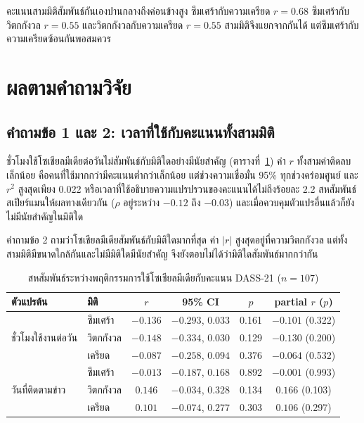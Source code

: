คะแนนสามมิติสัมพันธ์กันเองปานกลางถึงค่อนข้างสูง
ซึมเศร้ากับความเครียด $r = 0.68$ ซึมเศร้ากับวิตกกังวล $r = 0.55$ และวิตกกังวลกับความเครียด $r = 0.55$
สามมิติจึงแยกจากกันได้ แต่ซึมเศร้ากับความเครียดซ้อนกันพอสมควร

\section{ผลตามคำถามวิจัย}

\subsection{คำถามข้อ 1 และ 2: เวลาที่ใช้กับคะแนนทั้งสามมิติ}

ชั่วโมงใช้โซเชียลมีเดียต่อวันไม่สัมพันธ์กับมิติใดอย่างมีนัยสำคัญ (ตารางที่~\ref{tab:q123})
ค่า $r$ ทั้งสามค่าติดลบเล็กน้อย คือคนที่ใช้มากกว่ามีคะแนนต่ำกว่าเล็กน้อย
แต่ช่วงความเชื่อมั่น 95\% ทุกช่วงคร่อมศูนย์
และ $r^2$ สูงสุดเพียง 0.022 หรือเวลาที่ใช้อธิบายความแปรปรวนของคะแนนได้ไม่ถึงร้อยละ 2.2
สหสัมพันธ์สเปียร์แมนให้ผลทางเดียวกัน ($\rho$ อยู่ระหว่าง $-0.12$ ถึง $-0.03$)
และเมื่อควบคุมตัวแปรอื่นแล้วก็ยังไม่มีนัยสำคัญในมิติใด

คำถามข้อ 2 ถามว่าโซเชียลมีเดียสัมพันธ์กับมิติใดมากที่สุด
ค่า $|r|$ สูงสุดอยู่ที่ความวิตกกังวล แต่ทั้งสามมิติมีขนาดใกล้กันและไม่มีมิติใดมีนัยสำคัญ
จึงยังตอบไม่ได้ว่ามิติใดสัมพันธ์มากกว่ากัน

\begin{table}[H]
\centering
\caption{สหสัมพันธ์ระหว่างพฤติกรรมการใช้โซเชียลมีเดียกับคะแนน DASS-21 ($n = 107$)}
\label{tab:q123}
\begin{tabular}{|l|l|c|c|c|c|}
\hline
\textbf{ตัวแปรต้น} & \textbf{มิติ} & \textbf{$r$} & \textbf{95\% CI} & \textbf{$p$} & \textbf{partial $r$ ($p$)} \\
\hline
\multirow{3}{*}{ชั่วโมงใช้งานต่อวัน} & ซึมเศร้า & $-0.136$ & $-0.293$, $0.033$ & 0.161 & $-0.101$ (0.322) \\
 & วิตกกังวล & $-0.148$ & $-0.334$, $0.030$ & 0.129 & $-0.130$ (0.200) \\
 & เครียด & $-0.087$ & $-0.258$, $0.094$ & 0.376 & $-0.064$ (0.532) \\
\hline
\multirow{3}{*}{วันที่ติดตามข่าว} & ซึมเศร้า & $-0.013$ & $-0.187$, $0.168$ & 0.892 & $-0.001$ (0.993) \\
 & วิตกกังวล & $0.146$ & $-0.034$, $0.328$ & 0.134 & $0.166$ (0.103) \\
 & เครียด & $0.101$ & $-0.074$, $0.277$ & 0.303 & $0.106$ (0.297) \\
\hline
\end{tabular}
\end{table}


